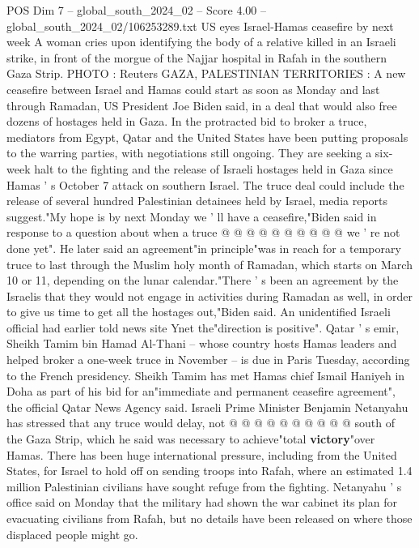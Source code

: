 \begin{textsample}{POS Dim 7 – global\_south\_2024\_02 – Score 4.00 – global\_south\_2024\_02/106253289.txt}  \label{ex:f7_pos_203}
US eyes Israel-Hamas ceasefire by next week A woman cries upon identifying the body of a relative killed in an Israeli strike, in front of the morgue of the Najjar hospital in Rafah in the southern Gaza Strip.
PHOTO : Reuters GAZA, PALESTINIAN TERRITORIES : A new ceasefire between Israel and Hamas could start as soon as Monday and last through Ramadan, US President Joe Biden said, in a deal that would also free dozens of hostages held in Gaza.
In the protracted bid to broker a truce, mediators from Egypt, Qatar and the United States have been putting proposals to the warring parties, with negotiations still ongoing.
They are seeking a six-week halt to the fighting and the release of Israeli hostages held in Gaza since Hamas ' s October 7 attack on southern Israel.
The truce deal could include the release of several hundred Palestinian detainees held by Israel, media reports suggest."My hope is by next Monday we ' ll have a ceasefire,"Biden said in response to a question about when a truce @ @ @ @ @ @ @ @ @ @ we ' re not done yet".
He later said an agreement"in principle"was in reach for a temporary truce to last through the Muslim holy month of Ramadan, which starts on March 10 or 11, depending on the lunar calendar."There ' s been an agreement by the Israelis that they would not engage in activities during Ramadan as well, in order to give us time to get all the hostages out,"Biden said.
An unidentified Israeli official had earlier told news site Ynet the"direction is positive".
Qatar ' s emir, Sheikh Tamim bin Hamad Al-Thani -- whose country hosts Hamas leaders and helped broker a one-week truce in November -- is due in Paris Tuesday, according to the French presidency.
Sheikh Tamim has met Hamas chief Ismail Haniyeh in Doha as part of his bid for an"immediate and permanent ceasefire agreement", the official Qatar News Agency said.
Israeli Prime Minister Benjamin Netanyahu has stressed that any truce would delay, not @ @ @ @ @ @ @ @ @ @ south of the Gaza Strip, which he said was necessary to achieve"total \textbf{victory}"over Hamas.
There has been huge international pressure, including from the United States, for Israel to hold off on sending troops into Rafah, where an estimated 1.4 million Palestinian civilians have sought refuge from the fighting.
Netanyahu ' s office said on Monday that the military had shown the war cabinet its plan for evacuating civilians from Rafah, but no details have been released on where those displaced people might go.

\end{textsample}

